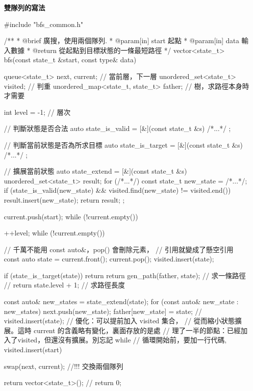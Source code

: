 \textbf{雙隊列的寫法}
\begin{Codex}[label=bfs_template1.cpp]
#include "bfs_common.h"

/**
 * @brief 廣搜，使用兩個隊列.
 * @param[in] start 起點
 * @param[in] data 輸入數據
 * @return 從起點到目標狀態的一條最短路徑
 */
vector<state_t> bfs(const state_t &start, const type& data) {
    queue<state_t> next, current; // 當前層，下一層
    unordered_set<state_t> visited; // 判重
    unordered_map<state_t, state_t> father; // 樹，求路徑本身時才需要

    int level = -1;  // 層次

    // 判斷狀態是否合法
    auto state_is_valid = [&](const state_t &s) { /*...*/ };

    // 判斷當前狀態是否為所求目標
    auto state_is_target = [&](const state_t &s) { /*...*/ };

    // 擴展當前狀態
    auto state_extend = [&](const state_t &s) {
        unordered_set<state_t> result;
        for (/*...*/) {
            const state_t new_state = /*...*/;
            if (state_is_valid(new_state) && 
                    visited.find(new_state) != visited.end()) {
                result.insert(new_state);
            }
        }
        return result;
    };

    current.push(start);
    while (!current.empty()) {
        ++level;
        while (!current.empty()) {
            // 千萬不能用 const auto&，pop() 會刪除元素，
            // 引用就變成了懸空引用
            const auto state = current.front();
            current.pop();
            visited.insert(state);

            if (state_is_target(state)) {
                return return gen_path(father, state); // 求一條路徑
                // return state.level + 1; // 求路徑長度
            }

            const auto& new_states = state_extend(state);
            for (const auto& new_state : new_states) {
                next.push(new_state);
                father[new_state] = state;
                // visited.insert(state); // 優化：可以提前加入 visited 集合，
                // 從而縮小狀態擴展。這時 current 的含義略有變化，裏面存放的是處
                // 理了一半的節點：已經加入了visited，但還沒有擴展。別忘記 while
                // 循環開始前，要加一行代碼, visited.insert(start)
            }
        }
        swap(next, current); //!!! 交換兩個隊列
    }

    return vector<state_t>();
    // return 0;
}
\end{Codex}


